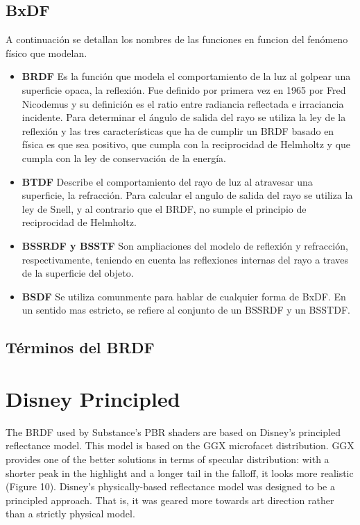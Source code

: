     \subsection{BxDF}
    A continuaci\'on se detallan los nombres de las funciones en funcion del fen\'omeno f\'isico que modelan.
    \begin{itemize}
        \item[] \textbf {BRDF} Es la funci\'on que modela el comportamiento de la luz al golpear una superficie opaca, la reflexi\'on. Fue definido por primera vez en 1965 por
        Fred Nicodemus y su definici\'on es el ratio entre radiancia reflectada e irraciancia incidente.
        Para determinar el \'angulo de salida del rayo se utiliza la ley de la reflexi\'on y las tres caracter\'isticas que ha de cumplir un BRDF basado en
        f\'isica es que sea positivo, que cumpla con la reciprocidad de Helmholtz y que cumpla con la ley de conservaci\'on de la energ\'ia.
        \item[] \textbf {BTDF} Describe el comportamiento del rayo de luz al atravesar una superficie, la refracci\'on. Para calcular el angulo de salida del rayo se utiliza la
        ley de Snell, y al contrario que el BRDF, no sumple el principio de reciprocidad de Helmholtz.
        \item[] \textbf {BSSRDF y BSSTF} Son ampliaciones del modelo de reflexi\'on y refracci\'on, respectivamente, teniendo en cuenta las reflexiones internas del rayo a traves de la
        superficie del objeto.
        \item[] \textbf {BSDF} Se utiliza comunmente para hablar de cualquier forma de BxDF. En un sentido mas estricto, se refiere al conjunto de un BSSRDF y un BSSTDF.
    \end{itemize}

    \subsection{T\'erminos del BRDF}

\section{Disney Principled}
The BRDF used by Substance’s PBR shaders are based on
Disney’s principled reflectance model. This model is based
on the GGX microfacet distribution. GGX provides one of the
better solutions in terms of specular distribution: with a shorter
peak in the highlight and a longer tail in the falloff, it looks more
realistic (Figure 10). Disney’s physically-based reflectance model was designed to
be a principled approach. That is, it was geared more towards
art direction rather than a strictly physical model.

